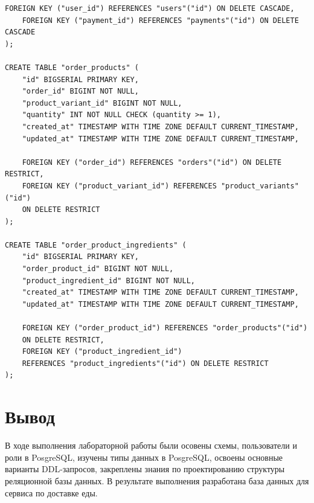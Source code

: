 \documentclass[a4paper,14pt]{extarticle}
\begin{document}
\begin{Verbatim}[tabsize=4,fontsize=\small]
    FOREIGN KEY ("user_id") REFERENCES "users"("id") ON DELETE CASCADE,
    FOREIGN KEY ("payment_id") REFERENCES "payments"("id") ON DELETE CASCADE
);

CREATE TABLE "order_products" (
    "id" BIGSERIAL PRIMARY KEY,
    "order_id" BIGINT NOT NULL,
    "product_variant_id" BIGINT NOT NULL,
    "quantity" INT NOT NULL CHECK (quantity >= 1),
    "created_at" TIMESTAMP WITH TIME ZONE DEFAULT CURRENT_TIMESTAMP,
    "updated_at" TIMESTAMP WITH TIME ZONE DEFAULT CURRENT_TIMESTAMP,

    FOREIGN KEY ("order_id") REFERENCES "orders"("id") ON DELETE RESTRICT,
    FOREIGN KEY ("product_variant_id") REFERENCES "product_variants"("id")
    ON DELETE RESTRICT
);

CREATE TABLE "order_product_ingredients" (
    "id" BIGSERIAL PRIMARY KEY,
    "order_product_id" BIGINT NOT NULL,
    "product_ingredient_id" BIGINT NOT NULL,
    "created_at" TIMESTAMP WITH TIME ZONE DEFAULT CURRENT_TIMESTAMP,
    "updated_at" TIMESTAMP WITH TIME ZONE DEFAULT CURRENT_TIMESTAMP,

    FOREIGN KEY ("order_product_id") REFERENCES "order_products"("id")
    ON DELETE RESTRICT,
    FOREIGN KEY ("product_ingredient_id") 
    REFERENCES "product_ingredients"("id") ON DELETE RESTRICT
);
  \end{Verbatim}

  \section*{Вывод}
  В ходе выполнения лабораторной работы были осовены схемы, пользователи и роли в PosgreSQL, изучены типы данных в PosgreSQL, освоены основные варианты DDL-запросов, закреплены знания по проектированию структуры реляционной базы данных. В результате выполнения разработана база данных для сервиса по доставке еды.
\end{document}
